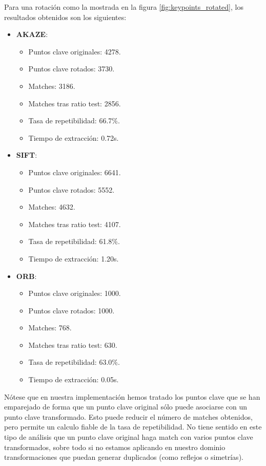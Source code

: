 \documentclass[11pt,a4paper]{article}
\begin{document}
Para una rotación como la mostrada en la figura \ref{fig:keypoints_rotated},
los resultados obtenidos son los siguientes:
\begin{itemize}
    \item \textbf{AKAZE}: 
    \begin{itemize}
        \item Puntos clave originales: 4278.
        \item Puntos clave rotados: 3730.
        \item Matches: 3186.
        \item Matches tras ratio test: 2856.
        \item Tasa de repetibilidad: 66.7\%.
        \item Tiempo de extracción: 0.72s.
    \end{itemize}
    \item \textbf{SIFT}:
    \begin{itemize}
        \item Puntos clave originales: 6641.
        \item Puntos clave rotados: 5552.
        \item Matches: 4632.
        \item Matches tras ratio test: 4107.
        \item Tasa de repetibilidad: 61.8\%.
        \item Tiempo de extracción: 1.20s.
    \end{itemize}
    \item \textbf{ORB}:
    \begin{itemize}
        \item Puntos clave originales: 1000.
        \item Puntos clave rotados: 1000.
        \item Matches: 768.
        \item Matches tras ratio test: 630.
        \item Tasa de repetibilidad: 63.0\%.
        \item Tiempo de extracción: 0.05s.
    \end{itemize}
\end{itemize}

Nótese que en nuestra implementación hemos tratado los puntos clave que 
se han emparejado de forma que un punto clave original sólo puede asociarse
con un punto clave transformado. Esto puede reducir el número de matches
obtenidos, pero permite un calculo fiable de la tasa de repetibilidad.
No tiene sentido en este tipo de análisis que un punto clave original
haga match con varios puntos clave transformados, sobre todo si no estamos
aplicando en nuestro dominio transformaciones que puedan generar
duplicados (como reflejos o simetrías).
\end{document}
